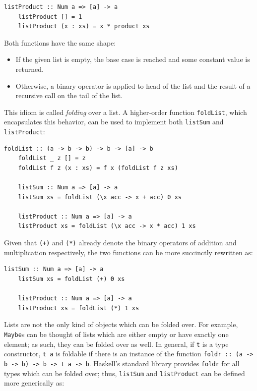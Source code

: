 \documentclass[UdineBachThesis,american,11pt]{PhdThesis}
\begin{document}
  \pagebreak

  \begin{Verbatim}[gobble=4,fontsize=\small]
    listProduct :: Num a => [a] -> a
    listProduct [] = 1
    listProduct (x : xs) = x * product xs
  \end{Verbatim}

  Both functions have the same shape:

  \begin{itemize}
    \item If the given list is empty, the base case is reached and some constant
    value is returned.

    \item Otherwise, a binary operator is applied to head of the list and the
    result of a recursive call on the tail of the list.
  \end{itemize}

  This idiom is called \emph{folding} over a list. A higher-order function
  \mbox{\texttt{foldList}}, which encapsulates this behavior, can be used to
  implement both \mbox{\texttt{listSum}} and \mbox{\texttt{listProduct}}:

  \begin{Verbatim}[gobble=4,fontsize=\small]
    foldList :: (a -> b -> b) -> b -> [a] -> b
    foldList _ z [] = z
    foldList f z (x : xs) = f x (foldList f z xs)

    listSum :: Num a => [a] -> a
    listSum xs = foldList (\x acc -> x + acc) 0 xs

    listProduct :: Num a => [a] -> a
    listProduct xs = foldList (\x acc -> x * acc) 1 xs
  \end{Verbatim}

  Given that \mbox{\texttt{(+)}} and \mbox{\texttt{(*)}} already denote the
  binary operators of addition and multiplication respectively, the two
  functions can be more succinctly rewritten as:

  \begin{Verbatim}[gobble=4,fontsize=\small]
    listSum :: Num a => [a] -> a
    listSum xs = foldList (+) 0 xs

    listProduct :: Num a => [a] -> a
    listProduct xs = foldList (*) 1 xs
  \end{Verbatim}

  Lists are not the only kind of objects which can be folded over. For example,
  \mbox{\texttt{Maybe}s} can be thought of lists which are either empty or have
  exactly one element; as such, they can be folded over as well. In general, if
  \texttt{t} is a type constructor, \mbox{\texttt{t a}} is foldable if there is
  an instance of the function
  \mbox{\texttt{foldr :: (a -> b -> b) -> b -> t a -> b}}. Haskell's standard
  library provides \mbox{\texttt{foldr}} for all types which can be folded over;
  thus, \mbox{\texttt{listSum}} and \mbox{\texttt{listProduct}} can be defined
  more generically as:
\end{document}
